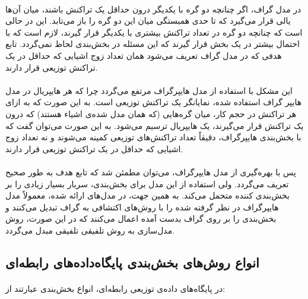 \paragraph*{}
در مدل گراف، اگر چنانچه دو گره با یکدیگر درون حداقل یک تراکنش باشند، میان آن‌ها یالی قرار می‌گیرد که تا حدی همبستگی میان این دو گره را باز می‌تابد. این در حالی است که چنانچه دو گره در تعداد تراکنش بیشتری با یکدیگر قرار گیرند، لازم است که با احتمال بیشتر در یک بخش قرار گیرند که این مسئله در بخش‌بندی لحاظ نمی‌گردد. تابع هدفی که در مدل گراف تعریف می‌شود همان تعداد زوج اشیایی که حداقل در یک تراکنش توزیعی قرار دارند.

\paragraph*{}
این مشکل با استفاده از مدل هایپرگراف مرتفع می‌گردد چرا که هر هایپریال در مدل هایپر گراف استفاده شده، نمایانگر یک تراکنش توزیعی است. به این صورت که به ازای هر تراکنش در حجم کار، میان گره‌هایی (که همان مدل شده‌ی اشیاء هستند) که درون یک تراکنش قرار می‌گیرند، یک هایپریال ترسیم می‌شود. به این صورت می‌توان گفت که با بخش‌بندی هایپرگراف، دقیقاً تعداد تراکنش‌های توزیعی کمینه می‌شوند و نه تعداد زوج اشیایی که حداقل در یک تراکنش توزیعی قرار دارند.

\paragraph*{}
پس با بهره‌گیری از مدل هایپرگراف، می‌توان مطمئن شد که تابع هدف به طور صحیح تعریف می‌گردد. ولی استفاده از این مدل برای بخش‌بندی، سربار بسیار زیادی را بر بخش‌بندی کننده
متحمل می‌کند.
\cite{kamal-2016}
به همین جهت، در مدل‌های ارائه شده، معمولاً مدل هایپرگراف در نظر گرفته شده را با روش‌های اکتشافی
به گراف تبدیل می‌کنند و بخش‌بندی را بر روی گراف بدست آمده اعمال می‌کنند که در این صورت، روش مدل‌سازی به روش تلفیقی تلفیقی مبدل می‌گردد.
\cite{sword-2013}


\subsection{انواع روش‌های بخش‌بندی پایگاه‌داده‌های رابطه‌ای}

\paragraph*{}
در پایگاه‌های داده‌ی توزیعی رابطه‌ای، انواع بخش‌بندی عبارتند از:

